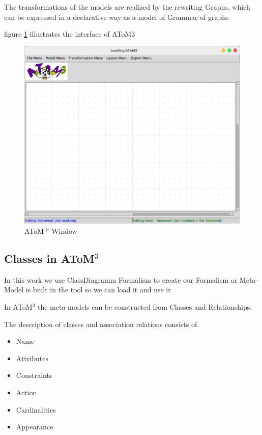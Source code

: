  The transformations of the models are realized by the rewriting
Graphs, which can be expressed in a declarative way as a model of
Grammar of graphs

 figure \ref{fig:AToM3 Window} illustrates the interface of AToM3 

\begin{figure}[th]
	\centering
		\includegraphics[scale=0.4]{chapiter3/img/atom3}
	\caption{\label{fig:AToM3 Window}AToM $^{3}$ Window}
\end{figure} 
\subsection{Classes in AToM$^{3}$ }
In this work we use ClassDiagramm Formalism to create  our Formalism 
or Meta-Model is built in the tool so we can load it and use  it
 
In AToM$^{3}$ the meta-models can be constructed from Classes and
Relationships.

The description of classes and association relations consists of

\begin{itemize}
\item  Name
\item  Attributes
\item  Constraints
\item  Action
\item  Cardinalities
\item  Appearance
\end{itemize}

